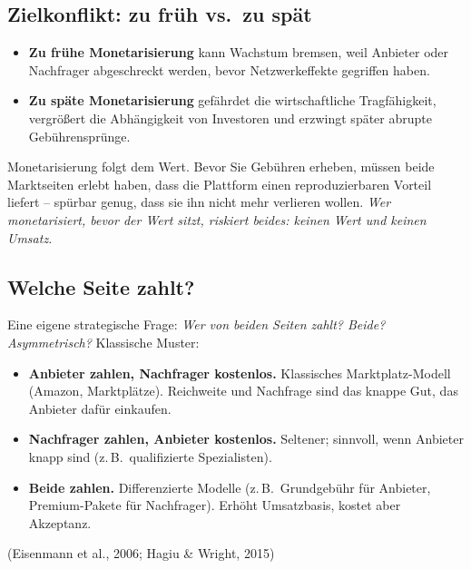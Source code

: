 \documentclass[11pt,a4paper,oneside]{article}
\newcommand{\quelle}[1]{{\footnotesize\color{lpGray}(#1)}}
\begin{document}
\subsection{Zielkonflikt: zu früh vs.\ zu spät}

\begin{itemize}
  \item \textbf{Zu frühe Monetarisierung} kann Wachstum bremsen, weil Anbieter oder Nachfrager abgeschreckt werden, bevor Netzwerkeffekte gegriffen haben.
  \item \textbf{Zu späte Monetarisierung} gefährdet die wirtschaftliche Tragfähigkeit, vergrößert die Abhängigkeit von Investoren und erzwingt später abrupte Gebührensprünge.
\end{itemize}

\begin{merkbox}
Monetarisierung folgt dem Wert. Bevor Sie Gebühren erheben, müssen beide Marktseiten erlebt haben, dass die Plattform einen reproduzierbaren Vorteil liefert -- spürbar genug, dass sie ihn nicht mehr verlieren wollen. \emph{Wer monetarisiert, bevor der Wert sitzt, riskiert beides: keinen Wert und keinen Umsatz.}
\end{merkbox}

\subsection{Welche Seite zahlt?}

Eine eigene strategische Frage: \emph{Wer von beiden Seiten zahlt? Beide? Asymmetrisch?} Klassische Muster:

\begin{itemize}
  \item \textbf{Anbieter zahlen, Nachfrager kostenlos.} Klassisches Marktplatz-Modell (Amazon, Marktplätze). Reichweite und Nachfrage sind das knappe Gut, das Anbieter dafür einkaufen.
  \item \textbf{Nachfrager zahlen, Anbieter kostenlos.} Seltener; sinnvoll, wenn Anbieter knapp sind (z.\,B.\ qualifizierte Spezialisten).
  \item \textbf{Beide zahlen.} Differenzierte Modelle (z.\,B.\ Grundgebühr für Anbieter, Premium-Pakete für Nachfrager). Erhöht Umsatzbasis, kostet aber Akzeptanz.
\end{itemize}

\quelle{Eisenmann et al., 2006; Hagiu \& Wright, 2015}

\end{document}
